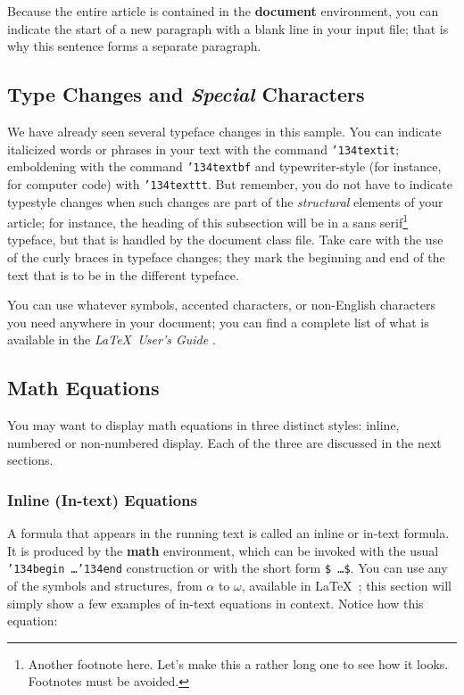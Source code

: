 \documentclass[sigconf]{acmart}
\begin{document}
Because the entire article is contained in the \textbf{document}
environment, you can indicate the start of a new paragraph with a
blank line in your input file; that is why this sentence forms a
separate paragraph.

\subsection{Type Changes and {\itshape Special} Characters}

We have already seen several typeface changes in this sample.  You can
indicate italicized words or phrases in your text with the command
\texttt{{\char'134}textit}; emboldening with the command
\texttt{{\char'134}textbf} and typewriter-style (for instance, for
computer code) with \texttt{{\char'134}texttt}.  But remember, you do
not have to indicate typestyle changes when such changes are part of
the \textit{structural} elements of your article; for instance, the
heading of this subsection will be in a sans serif\footnote{Another
  footnote here.  Let's make this a rather long one to see how it
  looks. Footnotes must be avoided.} typeface, but that is handled by
the document class file.  Take care with the use of the curly braces
in typeface changes; they mark the beginning and end of the text that
is to be in the different typeface.

You can use whatever symbols, accented characters, or non-English
characters you need anywhere in your document; you can find a complete
list of what is available in the \textit{\LaTeX\ User's Guide}
\cite{Lamport:LaTeX}.

\subsection{Math Equations}

You may want to display math equations in three distinct styles:
inline, numbered or non-numbered display.  Each of
the three are discussed in the next sections.

\subsubsection{Inline (In-text) Equations}

A formula that appears in the running text is called an
inline or in-text formula.  It is produced by the
\textbf{math} environment, which can be
invoked with the usual \texttt{{\char'134}begin\,\ldots{\char'134}end}
construction or with the short form \texttt{\$\,\ldots\$}. You
can use any of the symbols and structures,
from $\alpha$ to $\omega$, available in
\LaTeX~\cite{Lamport:LaTeX}; this section will simply show a
few examples of in-text equations in context. Notice how
this equation:
\end{document}
